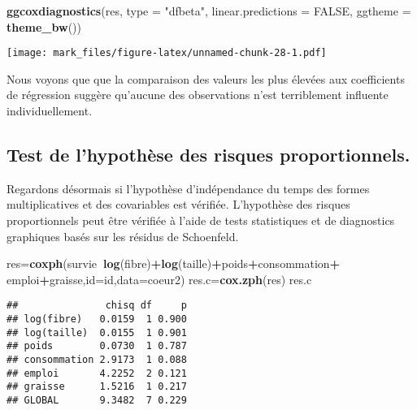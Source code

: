 \documentclass[
]{article}
\newenvironment{Shaded}{\begin{snugshade}}{\end{snugshade}}
\newcommand{\DataTypeTok}[1]{\textcolor[rgb]{0.13,0.29,0.53}{#1}}
\newcommand{\KeywordTok}[1]{\textcolor[rgb]{0.13,0.29,0.53}{\textbf{#1}}}
\newcommand{\NormalTok}[1]{#1}
\newcommand{\OperatorTok}[1]{\textcolor[rgb]{0.81,0.36,0.00}{\textbf{#1}}}
\newcommand{\OtherTok}[1]{\textcolor[rgb]{0.56,0.35,0.01}{#1}}
\newcommand{\StringTok}[1]{\textcolor[rgb]{0.31,0.60,0.02}{#1}}
\begin{document}
\begin{Shaded}
\begin{Highlighting}[]
\KeywordTok{ggcoxdiagnostics}\NormalTok{(res, }\DataTypeTok{type =} \StringTok{"dfbeta"}\NormalTok{,}
                 \DataTypeTok{linear.predictions =} \OtherTok{FALSE}\NormalTok{, }\DataTypeTok{ggtheme =} \KeywordTok{theme_bw}\NormalTok{())}
\end{Highlighting}
\end{Shaded}

\texttt{[image: mark\_files/figure-latex/unnamed-chunk-28-1.pdf]}

Nous voyons que que la comparaison des valeurs les plus élevées aux
coefficients de régression suggère qu'aucune des observations n'est
terriblement influente individuellement.

\hypertarget{test-de-lhypothuxe8se-des-risques-proportionnels.}{%
\subsection{Test de l'hypothèse des risques
proportionnels.}\label{test-de-lhypothuxe8se-des-risques-proportionnels.}}

Regardons désormais si l'hypothèse d'indépendance du temps des formes
multiplicatives et des covariables est vérifiée. L'hypothèse des risques
proportionnels peut être vérifiée à l'aide de tests statistiques et de
diagnostics graphiques basés sur les résidus de Schoenfeld.

\begin{Shaded}
\begin{Highlighting}[]
\NormalTok{res=}\KeywordTok{coxph}\NormalTok{(survie}\OperatorTok{~}\KeywordTok{log}\NormalTok{(fibre)}\OperatorTok{+}\KeywordTok{log}\NormalTok{(taille)}\OperatorTok{+}\NormalTok{poids}\OperatorTok{+}\NormalTok{consommation}\OperatorTok{+}
\StringTok{            }\NormalTok{emploi}\OperatorTok{+}\NormalTok{graisse,}\DataTypeTok{id=}\NormalTok{id,}\DataTypeTok{data=}\NormalTok{coeur2)}
\NormalTok{res.c=}\KeywordTok{cox.zph}\NormalTok{(res)}
\NormalTok{res.c}
\end{Highlighting}
\end{Shaded}

\begin{verbatim}
##               chisq df     p
## log(fibre)   0.0159  1 0.900
## log(taille)  0.0155  1 0.901
## poids        0.0730  1 0.787
## consommation 2.9173  1 0.088
## emploi       4.2252  2 0.121
## graisse      1.5216  1 0.217
## GLOBAL       9.3482  7 0.229
\end{verbatim}
\end{document}
